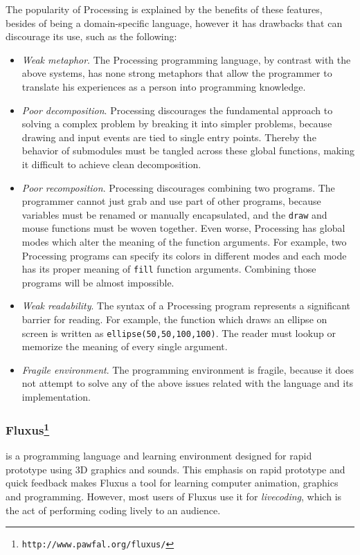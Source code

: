 The popularity of Processing is explained by the benefits of these features, besides of being a domain-specific language, however it has drawbacks that can discourage its use, such as the following:

\begin{itemize}
  \item \textit{Weak metaphor}. The Processing programming language, by contrast with the above systems, has none strong metaphors that allow the programmer to translate his experiences as a person into programming knowledge. 

  \item \textit{Poor decomposition}. Processing discourages the fundamental approach to solving a complex problem by breaking it into simpler problems, because drawing and input events are tied to single entry points. Thereby the behavior of submodules must be tangled across these global functions, making it difficult to achieve clean decomposition.

  \item \textit{Poor recomposition}. Processing discourages combining two programs. The programmer cannot just grab and use part of other programs, because variables must be renamed or manually encapsulated, and the \texttt{draw} and mouse functions must be woven together. Even worse, Processing has global modes which alter the meaning of the function arguments. For example, two Processing programs can specify its colors in different modes and each mode has its proper meaning of \texttt{fill} function arguments. Combining those programs will be almost impossible. 

  \item \textit{Weak readability}. The syntax of a Processing program represents a significant barrier for reading. For example, the function which draws an ellipse on screen is written as \texttt{ellipse(50,50,100,100)}. The reader must lookup or memorize the meaning of every single argument.

  \item \textit{Fragile environment}. The programming environment is fragile, because it does not attempt to solve any of the above issues related with the language and its implementation.
\end{itemize}

\subsubsection{Fluxus\protect\footnote{\texttt{http://www.pawfal.org/fluxus/}}} is a programming language and learning environment designed for rapid prototype using 3D graphics and sounds. This emphasis on rapid prototype and quick feedback makes Fluxus a tool for learning computer animation, graphics and programming. However, most users of Fluxus use it for \textit{livecoding}, which is the act of performing coding lively to an audience.

